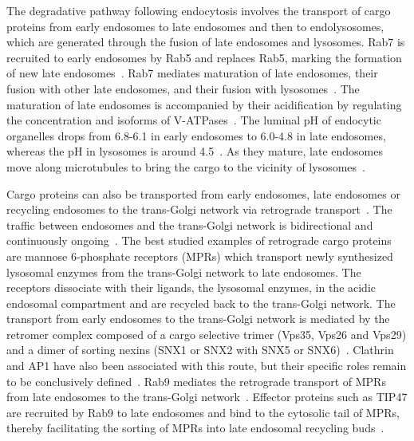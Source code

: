 The degradative pathway following endocytosis involves the transport of cargo proteins from early endosomes to late endosomes and then to endolysosomes, which are generated through the fusion of late endosomes and lysosomes. Rab7 is recruited to early endosomes by Rab5 and replaces Rab5, marking the formation of new late endosomes~\cite{Huotari}. Rab7 mediates maturation of late endosomes, their fusion with other late endosomes, and their fusion with lysosomes~\cite{Stenmark}. The maturation of late endosomes is accompanied by their acidification by regulating the concentration and isoforms of V-ATPases~\cite{Huotari}. The luminal pH of endocytic organelles drops from 6.8-6.1 in early endosomes to 6.0-4.8 in late endosomes, whereas the pH in lysosomes is around 4.5~\cite{Maxfield}. As they mature, late endosomes move along microtubules to bring the cargo to the vicinity of lysosomes~\cite{Huotari}.

Cargo proteins can also be transported from early endosomes, late endosomes or recycling endosomes to the trans-Golgi network via retrograde transport~\cite{Huotari,Johannes}. The traffic between endosomes and the trans-Golgi network is bidirectional and continuously ongoing~\cite{Huotari}. The best studied examples of retrograde cargo proteins are mannose 6-phosphate receptors (MPRs) which transport newly synthesized lysosomal enzymes from the trans-Golgi network to late endosomes. The receptors dissociate with their ligands, the lysosomal enzymes, in the acidic endosomal compartment and are recycled back to the trans-Golgi network. The transport from early endosomes to the trans-Golgi network is mediated by the retromer complex composed of a cargo selective trimer (Vps35, Vps26 and Vps29) and a dimer of sorting nexins (SNX1 or SNX2 with SNX5 or SNX6)~\cite{Johannes,Seaman}. Clathrin and AP1 have also been associated with this route, but their specific roles remain to be conclusively defined~\cite{Seaman}. Rab9 mediates the retrograde transport of MPRs from late endosomes to the trans-Golgi network~\cite{Stenmark}. Effector proteins such as TIP47 are recruited by Rab9 to late endosomes and bind to the cytosolic tail of MPRs, thereby facilitating the sorting of MPRs into late endosomal recycling buds~\cite{Stenmark}.
\newcommand{\keyword}[1]{\textbf{#1}}
\newcommand{\tabhead}[1]{\textbf{#1}}
\newcommand{\code}[1]{\texttt{#1}}
\newcommand{\file}[1]{\texttt{\bfseries#1}}
\newcommand{\option}[1]{\texttt{\itshape#1}}

